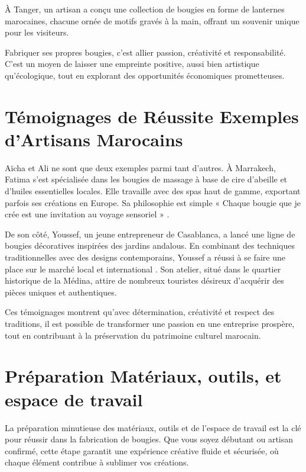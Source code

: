 \documentclass[11pt,fleqn,onecolumn,oneside]{book}
\begin{document}
\begin{example}
À Tanger, un artisan a conçu une collection de bougies en forme de lanternes marocaines, chacune ornée de motifs gravés à la main, offrant un souvenir unique pour les visiteurs.
\end{example}

\begin{definition}
Fabriquer ses propres bougies, c’est allier passion, créativité et responsabilité. C’est un moyen de laisser une empreinte positive, aussi bien artistique qu’écologique, tout en explorant des opportunités économiques prometteuses.
\end{definition}

\section{Témoignages de Réussite Exemples d’Artisans Marocains}

Aïcha et Ali ne sont que deux exemples parmi tant d’autres. À Marrakech, Fatima s’est spécialisée dans les bougies de massage à base de cire d’abeille et d’huiles essentielles locales. Elle travaille avec des spas haut de gamme, exportant parfois ses créations en Europe. Sa philosophie est simple « Chaque bougie que je crée est une invitation au voyage sensoriel » \cite{artisanMoroccanSuccess}.

De son côté, Youssef, un jeune entrepreneur de Casablanca, a lancé une ligne de bougies décoratives inspirées des jardins andalous. En combinant des techniques traditionnelles avec des designs contemporains, Youssef a réussi à se faire une place sur le marché local et international \cite{ouali2019}. Son atelier, situé dans le quartier historique de la Médina, attire de nombreux touristes désireux d'acquérir des pièces uniques et authentiques.

\noindent
Ces témoignages montrent qu’avec détermination, créativité et respect des traditions, il est possible de transformer une passion en une entreprise prospère, tout en contribuant à la préservation du patrimoine culturel marocain.

\section{Préparation Matériaux, outils, et espace de travail}

\begin{definition}
La préparation minutieuse des matériaux, outils et de l’espace de travail est la clé pour réussir dans la fabrication de bougies. Que vous soyez débutant ou artisan confirmé, cette étape garantit une expérience créative fluide et sécurisée, où chaque élément contribue à sublimer vos créations.
\end{definition}
\end{document}

